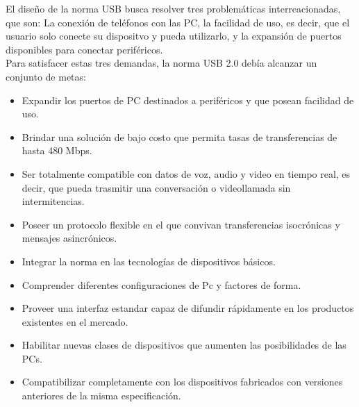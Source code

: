 El diseño de la norma USB busca resolver tres problemáticas interreacionadas, que son: La conexión de teléfonos con las PC, la facilidad de uso, es decir, que el usuario solo conecte su dispositvo y pueda utilizarlo, y la expansión de puertos disponibles para conectar periféricos. \cite{USBspec}\\

Para satisfacer estas tres demandas, la norma USB 2.0 debía alcanzar un conjunto de metas:

\begin{itemize}
	\item Expandir los puertos de PC destinados a periféricos y que posean facilidad de uso.
	\item Brindar una solución de bajo costo que permita tasas de transferencias de hasta 480 Mbps.
	\item Ser totalmente compatible con datos de voz, audio y video en tiempo real, es decir, que pueda trasmitir una conversación o videollamada sin intermitencias.
	\item Poseer un protocolo flexible en el que convivan transferencias isocrónicas y mensajes asincrónicos.
	\item Integrar la norma en las tecnologías de dispositivos básicos.
	\item Comprender diferentes configuraciones de Pc y factores de forma.
	\item Proveer una interfaz estandar capaz de difundir rápidamente en los productos existentes en el mercado.
	\item Habilitar nuevas clases de dispositivos que aumenten las posibilidades de las PCs.
	\item Compatibilizar completamente con los dispositivos fabricados con versiones anteriores de la misma especificación.
\end{itemize}